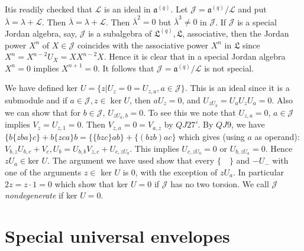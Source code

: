 \begin{examples*}
\begin{itemize}
  It\pageoriginale is readily checked that $\mathscr{L}$ is an ideal in
  $\mathfrak{a}^{(q)}$. Let $\mathscr{J}=\mathfrak{a}^{(q)}/\mathscr{L}$
  and put $\overline{\lambda}=\lambda+\mathscr{L}$. Then
  $\overline{\lambda}=\lambda+\mathscr{L}$. Then
  $\overline{\lambda}^{2}=0$ but $\overline{\lambda}^{3}\neq 0$ in
  $\mathscr{J}$. If $\mathscr{J}$ is a special Jordan algebra, say,
  $\mathscr{J}$ is a subalgebra of $\mathfrak{L}^{(q)},\mathfrak{L}$,
  associative, then the Jordan power $X^{n}$ of $X\in \mathscr{J}$
  coincides with the associative power $X^{n}$ in $\mathfrak{L}$ since
  $X^{n}=X^{n-2}U_X=XX^{n-2}X$. Hence it is clear that in a special
  Jordan algebra $X^{n}=0$ implies $X^{n+1}=0$. It follows that
  $\mathscr{J}=\mathfrak{a}^{(q)}/\mathscr{L}$ is not special.
  
  We have defined ker $U=\{z|U_z=0=U_{z,a},a\in
  \mathscr{J}\}$. This is an ideal since it is a submodule and if
  $a\in \mathscr{J}, z\in \ker U$, then $aU_z=0$, and
  $U_{zU_a}=U_aU_zU_a=0$. Also we can show that for $b\in
  \mathscr{J}$, $U_{zU_a,b}=0$. To see this we note that $U_{z,a}=0$,
  $a\in \mathscr{J}$ implies $V_z=U_{z,1}=0$. Then
  $V_{z,a}=0=V_{a,z}$ by $QJ 27'$. By $QJ9$, we have
  $\{b\{zba\}c\}+b\{zca\}b=\{\{bzc\}ab\}+\{(bzb)ac\}$ which gives (using
  $a$ as operand): $V_{b,z}U_{b,c}+V_c, U_b=U_{b,b}
  V_{z,c}+U_{c,zU_{b}}$. This implies $U_{c, zU_b}=0$ or
  $U_{b,zU_a}=0$. Hence $zU_a\in$ker $U$. The argument we have
  used show that every $\{\quad\}$ and $-U_{-}$ with one of the arguments
  $z\in$ ker $U$ is $0$, with the exception of $zU_a$. In
  particular $2z=z\cdot 1=0$ which show that ker $U=0$ if
  $\mathscr{J}$ has no two torsion. We call $\mathscr{J}$ {\em
    nondegenerate} if ker $U=0$.
\end{itemize}
\end{examples*}

\section{Special universal envelopes}\label{c1:sec6}

